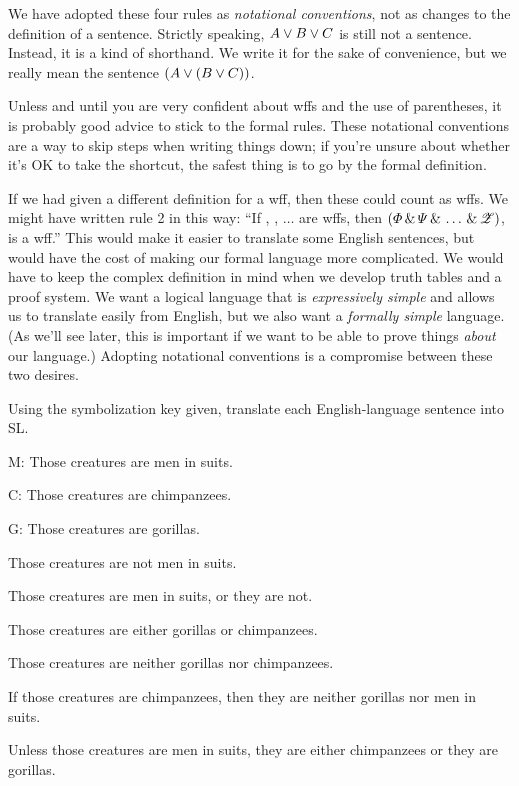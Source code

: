 We have adopted these four rules as \emph{notational conventions}, not as changes to the definition of a sentence. Strictly speaking, $A \vee B \vee C$ is still not a sentence. Instead, it is a kind of shorthand. We write it for the sake of convenience, but we really mean the sentence $(A \vee (B \vee C))$.

Unless and until you are very confident about wffs and the use of parentheses, it is probably good advice to stick to the formal rules. These notational conventions are a way to skip steps when writing things down; if you're unsure about whether it's OK to take the shortcut, the safest thing is to go by the formal definition.

If we had given a different definition for a wff, then these could count as wffs. We might have written rule 2 in this way: ``If \metaA{}, \metaB{}, $\ldots$  are wffs, then $(\varPhi{}\,\&\,\varPsi{}\,\&\,\ldots\,\&\,\mathscr{Z})$, is a wff.'' This would make it easier to translate some English sentences, but would have the cost of making our formal language more complicated. We would have to keep the complex definition in mind when we develop truth tables and a proof system. We want a logical language that is \emph{expressively simple} and allows us to translate easily from English, but we also want a \emph{formally simple} language. (As we'll see later, this is important if we want to be able to prove things \emph{about} our language.) Adopting notational conventions is a compromise between these two desires.



\practiceproblems

\solutions
\problempart Using the symbolization key given, translate each English-language sentence into SL.
\label{pr.monkeysuits}
\begin{ekey}
\item[M:] Those creatures are men in suits. 
\item[C:] Those creatures are chimpanzees. 
\item[G:] Those creatures are gorillas.
\end{ekey}
\begin{earg}
\item Those creatures are not men in suits.
\item Those creatures are men in suits, or they are not.
\item Those creatures are either gorillas or chimpanzees.
\item Those creatures are neither gorillas nor chimpanzees.
\item If those creatures are chimpanzees, then they are neither gorillas nor men in suits.
\item Unless those creatures are men in suits, they are either chimpanzees or they are gorillas.
\end{earg}


